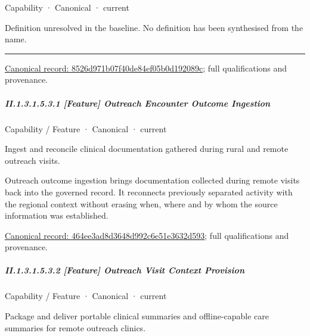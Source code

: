 \label{element:8526d971b07f40de84ef05b0d192089c}
{\small Capability · Canonical · current}\par

Definition unresolved in the baseline. No definition has been synthesised from the name.



\medskip\hrule\medskip

{\footnotesize \href{../../../../continuum/strategy/capability/8526d971b07f40de84ef05b0d192089c.md}{Canonical record: 8526d971b07f40de84ef05b0d192089c}; full qualifications and provenance.}\par
\subparagraph*{II.1.3.1.5.3.1 [Feature] Outreach Encounter Outcome Ingestion}
\label{navigation:II.1.3.1.5.3.1}

\label{element:464ee3ad8d3648d992c6e51e3632d593}
{\small Capability / Feature · Canonical · current}\par

Ingest and reconcile clinical documentation gathered during rural and remote outreach visits.



Outreach outcome ingestion brings documentation collected during remote visits back into the governed record. It reconnects previously separated activity with the regional context without erasing when, where and by whom the source information was established.


{\footnotesize \href{../../../../continuum/strategy/capability/feature/464ee3ad8d3648d992c6e51e3632d593.md}{Canonical record: 464ee3ad8d3648d992c6e51e3632d593}; full qualifications and provenance.}\par
\subparagraph*{II.1.3.1.5.3.2 [Feature] Outreach Visit Context Provision}
\label{navigation:II.1.3.1.5.3.2}

\label{element:44049d029a41437685272dfe94db4a2a}
{\small Capability / Feature · Canonical · current}\par

Package and deliver portable clinical summaries and offline-capable care summaries for remote outreach clinics.



